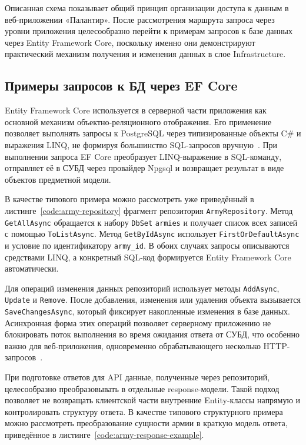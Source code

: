 Описанная схема показывает общий принцип организации доступа к данным в веб-приложении «Палантир». После рассмотрения маршрута запроса через уровни приложения целесообразно перейти к примерам запросов к базе данных через Entity Framework Core, поскольку именно они демонстрируют практический механизм получения и изменения данных в слое Infrastructure.

\subsection{Примеры запросов к БД через EF Core}

Entity Framework Core используется в серверной части приложения как основной механизм объектно-реляционного отображения. Его применение позволяет выполнять запросы к PostgreSQL через типизированные объекты C\# и выражения LINQ, не формируя большинство SQL-запросов вручную~\cite{efcore_overview}. При выполнении запроса EF Core преобразует LINQ-выражение в SQL-команду, отправляет её в СУБД через провайдер Npgsql и возвращает результат в виде объектов предметной модели.

В качестве типового примера можно рассмотреть уже приведённый в листинге~\ref{code:army-repository} фрагмент репозитория \texttt{ArmyRepository}. Метод \texttt{GetAllAsync} обращается к набору \texttt{DbSet} \texttt{armies} и получает список всех записей с помощью \texttt{ToListAsync}. Метод \texttt{GetByIdAsync} использует \texttt{FirstOrDefaultAsync} и условие по идентификатору \texttt{army\_id}. В обоих случаях запросы описываются средствами LINQ, а конкретный SQL-код формируется Entity Framework Core автоматически.

Для операций изменения данных репозиторий использует методы \texttt{AddAsync}, \texttt{Update} и \texttt{Remove}. После добавления, изменения или удаления объекта вызывается \texttt{SaveChangesAsync}, который фиксирует накопленные изменения в базе данных. Асинхронная форма этих операций позволяет серверному приложению не блокировать поток выполнения во время ожидания ответа от СУБД, что особенно важно для веб-приложения, одновременно обрабатывающего несколько HTTP-запросов~\cite{csharp_docs}.

При подготовке ответов для API данные, полученные через репозиторий, целесообразно преобразовывать в отдельные response-модели. Такой подход позволяет не возвращать клиентской части внутренние Entity-классы напрямую и контролировать структуру ответа. В качестве типового структурного примера можно рассмотреть преобразование сущности армии в краткую модель ответа, приведённое в листинге~\ref{code:army-response-example}.

